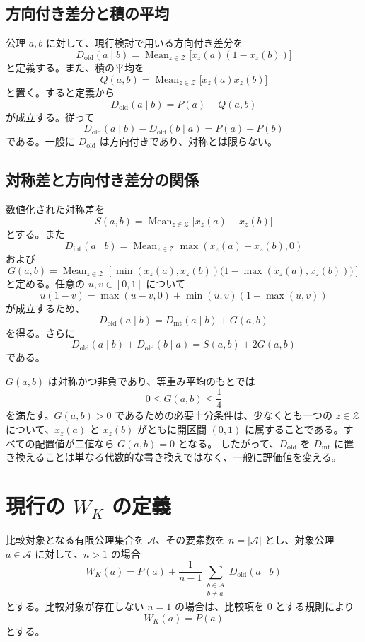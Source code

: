 \documentclass[a4paper,11pt]{ltjsarticle}
\begin{document}
\subsection{方向付き差分と積の平均}
公理 $a,b$ に対して、現行検討で用いる方向付き差分を
\[
D_{\mathrm{old}}(a\mid b)
=\operatorname{Mean}_{z\in\mathcal{Z}}
\bigl[x_z(a)(1-x_z(b))\bigr]
\]
と定義する。また、積の平均を
\[
Q(a,b)=\operatorname{Mean}_{z\in\mathcal{Z}}
\bigl[x_z(a)x_z(b)\bigr]
\]
と置く。すると定義から
\[
\boxed{D_{\mathrm{old}}(a\mid b)=P(a)-Q(a,b)}
\]
が成立する。従って
\[
D_{\mathrm{old}}(a\mid b)-D_{\mathrm{old}}(b\mid a)=P(a)-P(b)
\]
である。一般に $D_{\mathrm{old}}$ は方向付きであり、対称とは限らない。

\subsection{対称差と方向付き差分の関係}
数値化された対称差を
\[
S(a,b)=\operatorname{Mean}_{z\in\mathcal{Z}}
\lvert x_z(a)-x_z(b)\rvert
\]
とする。また
\[
D_{\mathrm{int}}(a\mid b)=\operatorname{Mean}_{z\in\mathcal{Z}}
\max(x_z(a)-x_z(b),0)
\]
および
\[
G(a,b)=\operatorname{Mean}_{z\in\mathcal{Z}}\left[
\min(x_z(a),x_z(b))\bigl(1-\max(x_z(a),x_z(b))\bigr)\right]
\]
と定める。任意の $u,v\in[0,1]$ について
\[
u(1-v)=\max(u-v,0)+\min(u,v)(1-\max(u,v))
\]
が成立するため、
\[
\boxed{D_{\mathrm{old}}(a\mid b)=D_{\mathrm{int}}(a\mid b)+G(a,b)}
\]
を得る。さらに
\[
\boxed{D_{\mathrm{old}}(a\mid b)+D_{\mathrm{old}}(b\mid a)=S(a,b)+2G(a,b)}
\]
である。

$G(a,b)$ は対称かつ非負であり、等重み平均のもとでは
\[
0\le G(a,b)\le\frac14
\]
を満たす。$G(a,b)>0$ であるための必要十分条件は、少なくとも一つの $z\in\mathcal{Z}$ について、$x_z(a)$ と $x_z(b)$ がともに開区間 $(0,1)$ に属することである。すべての配置値が二値なら $G(a,b)=0$ となる。
したがって、$D_{\mathrm{old}}$ を $D_{\mathrm{int}}$ に置き換えることは単なる代数的な書き換えではなく、一般に評価値を変える。

\section{現行の $W_K$ の定義}
比較対象となる有限公理集合を $\mathcal{A}$、その要素数を $n=|\mathcal{A}|$ とし、対象公理 $a\in\mathcal{A}$ に対して、$n>1$ の場合
\[
\boxed{
W_K(a)=P(a)+\frac{1}{n-1}
\sum_{\substack{b\in\mathcal{A}\\b\ne a}}
D_{\mathrm{old}}(a\mid b)
}
\tag{1}
\]
とする。比較対象が存在しない $n=1$ の場合は、比較項を $0$ とする規則により
\[
W_K(a)=P(a)
\tag{2}
\]
とする。
\end{document}
